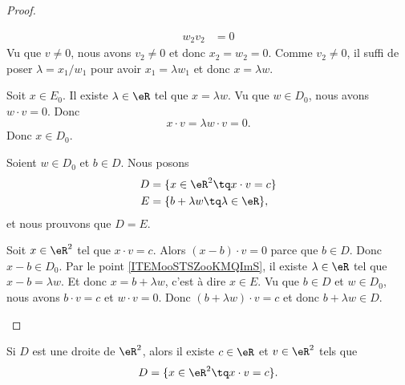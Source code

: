 \begin{proof}
\begin{subproof}
\begin{subproof}
\begin{subproof}
\begin{subequations}
\begin{align}
						w_2v_2 & =0
					\end{align}
				\end{subequations}
				Vu que \( v\neq 0\), nous avons \( v_2\neq 0\) et donc \( x_2=w_2=0\). Comme \( v_2\neq 0\), il suffi de poser \( \lambda=x_1/w_1\) pour avoir \( x_1=\lambda w_1\) et donc \( x=\lambda w\).
			\end{subproof}
			\spitem[\( E_0\subset D_0\)]
			Soit \( x\in E_0\). Il existe \( \lambda\in \eR\) tel que \( x=\lambda w\). Vu que \( w\in D_0\), nous avons \( w\cdot v=0\). Donc
			\begin{equation}
				x\cdot v=\lambda w\cdot v=0.
			\end{equation}
			Donc \( x\in D_0\).
		\end{subproof}
		Soient \( w\in D_0\) et \( b\in D\). Nous posons
		\begin{subequations}
			\begin{align}
				D & =\{ x\in \eR^2\tq x\cdot v=c \}       \\
				E & =\{ b+\lambda w\tq \lambda\in \eR \},
			\end{align}
		\end{subequations}
		et nous prouvons que \( D=E\).
		\begin{subproof}
			\spitem[\( D\subset E\)]
			Soit \( x\in \eR^2\) tel que \( x\cdot v=c\). Alors \( (x-b)\cdot v=0\) parce que \( b\in D\). Donc \( x-b\in D_0\). Par le point \ref{ITEMooSTSZooKMQImS}, il existe \( \lambda\in \eR\) tel que \( x-b=\lambda w\). Et donc \( x=b+\lambda w\), c'est à dire \( x\in E\).
			\spitem[\( E\subset D\)]
			Vu que \( b\in D\) et \( w\in D_0\), nous avons  \( b\cdot v=c\) et \( w\cdot v=0\). Donc \( (b+\lambda w)\cdot v=c\) et donc \( b+\lambda w\in D\).
		\end{subproof}
	\end{subproof}
\end{proof}


\begin{proposition}	\label{PROPooJSBKooJspdiF}
	Si \( D\) est une droite de \( \eR^2\), alors il existe \( c\in \eR\) et \( v\in \eR^2\) tels que
	\begin{equation}
		D=\{ x\in \eR^2 \tq x\cdot v=c \}.
	\end{equation}
\end{proposition}

